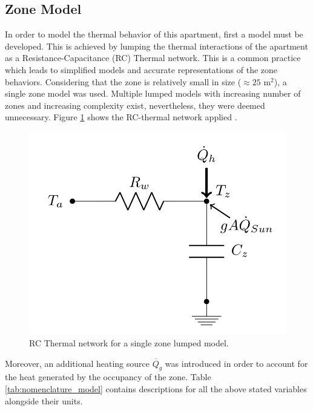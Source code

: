 \subsection{Zone Model}
\label{subsec:zone_model}
In order to model the thermal behavior of this apartment, first a model must be developed. This is achieved by lumping the thermal interactions of the apartment as a Resistance-Capacitance (RC) Thermal network. This is a common practice which leads to simplified models and accurate representations of the zone behaviors. Considering that the zone is relatively small in size ($\approx25$ m$^2$), a single zone model was used. Multiple lumped models with increasing number of zones and increasing complexity exist, nevertheless, they were deemed unnecessary. Figure \ref{fig:single_zone} shows the RC-thermal network applied \cite{drgovna2020all}.

\begin{figure}[H]
\centering
\includegraphics[scale=0.5]{images/single_zone.png}
\caption{RC Thermal network for a single zone lumped model.}
\label{fig:single_zone}
\end{figure}

Moreover, an additional heating source $\dot{Q_g}$ was introduced in order to account for the heat generated by the occupancy of the zone. Table \ref{tab:nomenclature_model} contains descriptions for all the above stated variables alongside their units.

